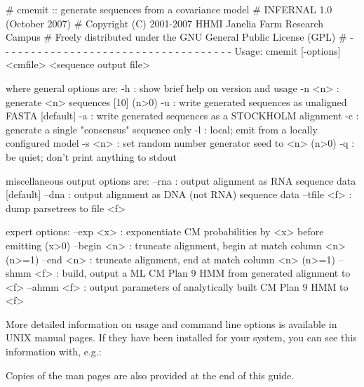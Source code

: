 
\begin{sreoutput}
# cmemit :: generate sequences from a covariance model
# INFERNAL 1.0 (October 2007)
# Copyright (C) 2001-2007 HHMI Janelia Farm Research Campus
# Freely distributed under the GNU General Public License (GPL)
# - - - - - - - - - - - - - - - - - - - - - - - - - - - - - - - - - - - -
Usage: cmemit [-options] <cmfile> <sequence output file>

where general options are:
  -h           : show brief help on version and usage
  -n <n>       : generate <n> sequences  [10]  (n>0)
  -u           : write generated sequences as unaligned FASTA  [default]
  -a           : write generated sequences as a STOCKHOLM alignment
  -c           : generate a single "consensus" sequence only
  -l           : local; emit from a locally configured model
  -s <n>       : set random number generator seed to <n>  (n>0)
  -q           : be quiet; don't print anything to stdout

miscellaneous output options are:
  --rna       : output alignment as RNA sequence data  [default]
  --dna       : output alignment as DNA (not RNA) sequence data
  --tfile <f> : dump parsetrees to file <f>

expert options:
  --exp <x>   : exponentiate CM probabilities by <x> before emitting  (x>0)
  --begin <n> : truncate alignment, begin at match column <n>  (n>=1)
  --end <n>   : truncate alignment,   end at match column <n>  (n>=1)
  --shmm <f>  : build, output a ML CM Plan 9 HMM from generated alignment to <f>
  --ahmm <f>  : output parameters of analytically built CM Plan 9 HMM to <f>
\end{sreoutput}

More detailed information on usage and command line options is
available in UNIX manual pages. If they have been installed for your
system, you can see this information with, e.g.:


Copies of the man pages are also provided at the end of this guide.

